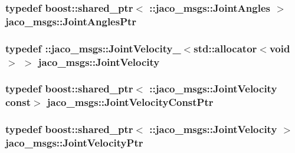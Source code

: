 \subsubsection[{\texorpdfstring{Joint\+Angles\+Ptr}{JointAnglesPtr}}]{\setlength{\rightskip}{0pt plus 5cm}typedef boost\+::shared\+\_\+ptr$<$ \+::{\bf jaco\+\_\+msgs\+::\+Joint\+Angles} $>$ {\bf jaco\+\_\+msgs\+::\+Joint\+Angles\+Ptr}}\hypertarget{namespacejaco__msgs_a831b44f31c7fdaa5447595c9e89df4d9}{}\label{namespacejaco__msgs_a831b44f31c7fdaa5447595c9e89df4d9}
\subsubsection[{\texorpdfstring{Joint\+Velocity}{JointVelocity}}]{\setlength{\rightskip}{0pt plus 5cm}typedef \+::{\bf jaco\+\_\+msgs\+::\+Joint\+Velocity\+\_\+}$<$std\+::allocator$<$void$>$ $>$ {\bf jaco\+\_\+msgs\+::\+Joint\+Velocity}}\hypertarget{namespacejaco__msgs_a3885bcb43e15bd44e269141fd88ae604}{}\label{namespacejaco__msgs_a3885bcb43e15bd44e269141fd88ae604}
\subsubsection[{\texorpdfstring{Joint\+Velocity\+Const\+Ptr}{JointVelocityConstPtr}}]{\setlength{\rightskip}{0pt plus 5cm}typedef boost\+::shared\+\_\+ptr$<$ \+::{\bf jaco\+\_\+msgs\+::\+Joint\+Velocity} const$>$ {\bf jaco\+\_\+msgs\+::\+Joint\+Velocity\+Const\+Ptr}}\hypertarget{namespacejaco__msgs_aab606d270e36965850c5e08ce8073242}{}\label{namespacejaco__msgs_aab606d270e36965850c5e08ce8073242}
\subsubsection[{\texorpdfstring{Joint\+Velocity\+Ptr}{JointVelocityPtr}}]{\setlength{\rightskip}{0pt plus 5cm}typedef boost\+::shared\+\_\+ptr$<$ \+::{\bf jaco\+\_\+msgs\+::\+Joint\+Velocity} $>$ {\bf jaco\+\_\+msgs\+::\+Joint\+Velocity\+Ptr}}\hypertarget{namespacejaco__msgs_a7bf43beaff6bea1d39b3392ed5ce08d6}{}\label{namespacejaco__msgs_a7bf43beaff6bea1d39b3392ed5ce08d6}
